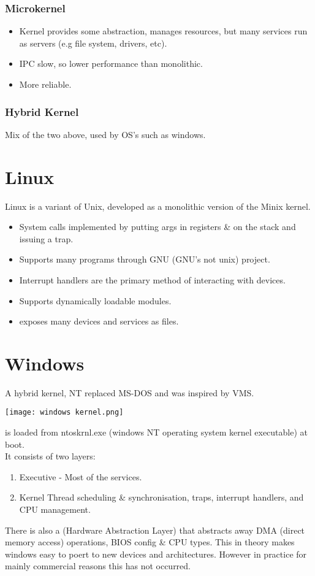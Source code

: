 \documentclass{report}
\begin{document}
\subsubsection*{Microkernel}
\begin{itemize}
	\item Kernel provides some abstraction, manages resources, but many services run as servers (e.g file system, drivers, etc).
	\item IPC slow, so lower performance than monolithic.
	\item More reliable.
\end{itemize}
\subsubsection*{Hybrid Kernel}
Mix of the two above, used by OS's such as windows.
\section*{Linux}
Linux is a variant of Unix, developed as a monolithic version of the Minix kernel.
\begin{itemize}
	\item System calls implemented by putting args in registers \& on the stack and issuing a trap.
	\item Supports many programs through GNU (GNU's not unix) project.
	\item Interrupt handlers are the primary method of interacting with devices.
	\item Supports dynamically loadable modules.
	\item exposes many devices and services as files.
\end{itemize}
\section*{Windows}
A hybrid kernel, NT replaced MS-DOS and was inspired by VMS.
\begin{center}
	\texttt{[image: windows kernel.png]}
\end{center}
 is loaded from ntoskrnl.exe (windows NT operating system kernel executable) at boot.
\\ It consists of two layers:
\begin{enumerate}
	\item Executive - Most of the services.
	\item Kernel Thread scheduling \& synchronisation, traps, interrupt handlers, and CPU management.
\end{enumerate}
There is also a  (Hardware Abstraction Layer) that abstracts away DMA (direct memory access) operations, BIOS config \& CPU types. This in theory makes windows easy to poert to new devices and architectures. However in practice for mainly commercial reasons this has not occurred.
\end{document}

